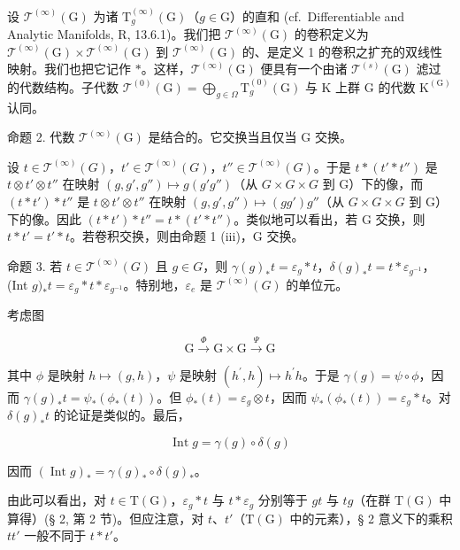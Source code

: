 设 \(\mathcal{T}^{(\infty)}(\mathrm{G})\) 为诸 \(\mathrm{T}_g^{(\infty)}(\mathrm{G})\)（\(g\in \mathrm{G}\)）的直和 (cf.~Differentiable and Analytic Manifolds, R, 13.6.1)。我们把 \(\mathcal{T}^{(\infty)}(\mathrm{G})\) 的卷积定义为 \(\mathcal{T}^{(\infty)}(\mathrm{G})\times \mathcal{T}^{(\infty)}(\mathrm{G})\) 到 \(\mathcal{T}^{(\infty)}(\mathrm{G})\) 的、是定义 1 的卷积之扩充的双线性映射。我们也把它记作 \(*\)。这样，\(\mathcal{T}^{(\infty)}(\mathrm{G})\) 便具有一个由诸 \(\mathcal{T}^{(s)}(\mathrm{G})\) 滤过的代数结构。子代数 \(\mathcal{T}^{(0)}(\mathrm{G}) = \bigoplus_{g\in \Omega}\mathrm{T}_g^{(0)}(\mathrm{G})\) 与 K 上群 G 的代数 \(\mathrm{K}^{\mathrm{(G)}}\) 认同。

命题 2. 代数 \(\mathcal{T}^{(\infty)}(\mathrm{G})\) 是结合的。它交换当且仅当 \(\mathrm{G}\) 交换。

设 \(t \in \mathcal{T}^{(\infty)}(G)\)，\(t' \in \mathcal{T}^{(\infty)}(G)\)，\(t'' \in \mathcal{T}^{(\infty)}(G)\)。于是 \(t * (t' * t'')\) 是 \(t \otimes t' \otimes t''\) 在映射 \((g, g', g'') \mapsto g(g'g'')\)（从 \(G \times G \times G\) 到 G）下的像，而 \((t * t') * t''\) 是 \(t \otimes t' \otimes t''\) 在映射 \((g, g', g'') \mapsto (gg')g''\)（从 \(G \times G \times G\) 到 G）下的像。因此 \((t * t') * t'' = t * (t' * t'')\)。类似地可以看出，若 G 交换，则 \(t * t' = t' * t\)。若卷积交换，则由命题 1 (iii)，G 交换。

命题 3. 若 \(t \in \mathcal{T}^{(\infty)}(G)\) 且 \(g \in G\)，则 \(\gamma(g)_*t = \varepsilon_g * t\)，\(\delta(g)_*t = t * \varepsilon_{g^{-1}}\)，(Int \(g)_*t = \varepsilon_g * t * \varepsilon_{g^{-1}}\)。特别地，\(\varepsilon_e\) 是 \(\mathcal{T}^{(\infty)}(G)\) 的单位元。

考虑图

\[
\mathrm{G} \xrightarrow {\Phi} \mathrm{G} \times \mathrm{G} \xrightarrow {\Psi} \mathrm{G}
\]

其中 \(\phi\) 是映射 \(h\mapsto (g,h)\)，\(\psi\) 是映射 \((h^{\prime},h)\mapsto h^{\prime}h\)。于是 \(\gamma (g) = \psi \circ \phi\)，因而 \(\gamma (g)_*t = \psi_*(\phi_*(t))\)。但 \(\phi_{*}(t) = \varepsilon_{g}\otimes t\)，因而 \(\psi_{*}(\phi_{*}(t)) = \varepsilon_{g}*t\)。对 \(\delta (g)_*t\) 的论证是类似的。最后，

\[
\operatorname{Int} g = \gamma (g) \circ \delta (g)
\]

因而 \((\operatorname{Int} g)_* = \gamma(g)_* \circ \delta(g)_*\)。

由此可以看出，对 \(t \in \mathrm{T}(\mathrm{G})\)，\(\varepsilon_g * t\) 与 \(t * \varepsilon_g\) 分别等于 \(gt\) 与 \(tg\)（在群 \(\mathrm{T}(\mathrm{G})\) 中算得）(§ 2, 第 2 节)。但应注意，对 \(t\)、\(t'\)（\(\mathrm{T}(\mathrm{G})\) 中的元素），§ 2 意义下的乘积 \(tt'\) 一般不同于 \(t * t'\)。

